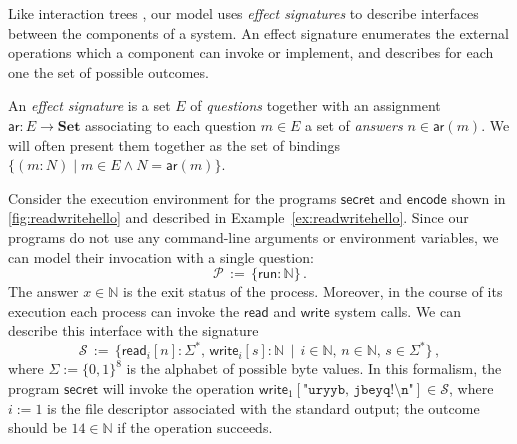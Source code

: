 \documentclass[acmsmall,screen,review,nonacm]{acmart}
\newcommand{\kw}[1]{\ensuremath{ \mathsf{#1} }}
\begin{document}
Like interaction trees \cite{itrees},
our model uses \emph{effect signatures}
to describe interfaces between the components of a system.
An effect signature enumerates
the external operations which
a component can invoke or implement,
and describes for each one
the set of possible outcomes.

\begin{definition} \label{def:esig}
An \emph{effect signature} is a set $E$ of \emph{questions}
together with an assignment $\kw{ar} : E \rightarrow \mathbf{Set}$
associating to each question $m \in E$
a set of \emph{answers} $n \in \kw{ar}(m)$.
We will often present them together as the set of bindings
$\{ (m \mathbin: N) \mid m \in E \wedge N = \kw{ar}(m) \}$.
\end{definition}


\begin{example} \label{ex:fdsig} %
Consider the execution environment
for the programs \kw{secret} and \kw{encode}
shown in \autoref{fig:readwritehello} and
described in Example~\ref{ex:readwritehello}.
Since our programs
do not use any command-line arguments or environment variables,
we can model their invocation with a single question:
\[
  \mathcal{P} \, := \,
    \{ \kw{run} : \mathbb{N} \}
  \,.
\]
The answer $x \in \mathbb{N}$ is the exit status of the process.
Moreover, in the course of its execution
each process can invoke the \kw{read} and \kw{write} system calls.
We can describe this interface with the signature
\[
  \mathcal{S} \, := \, \{
    \kw{read}_i[n] \mathbin: \Sigma^* , \,
    \kw{write}_i[s] \mathbin: \mathbb{N} \, \mid \,
    i \in \mathbb{N}, \,
    n \in \mathbb{N}, \,
    s \in \Sigma^*
  \}
  \,,
\]
where $\Sigma := \{0,1\}^8$ is the alphabet of possible byte values.
In this formalism,
the program \kw{secret} will invoke
the operation
$\kw{write}_1[\texttt{"uryyb, jbeyq!\textbackslash{}n"}]
 \in \mathcal{S}$,
where $i := 1$ is the file descriptor associated with the standard output;
the outcome should be $14 \in \mathbb{N}$
if the operation succeeds.
\end{example}
\end{document}

